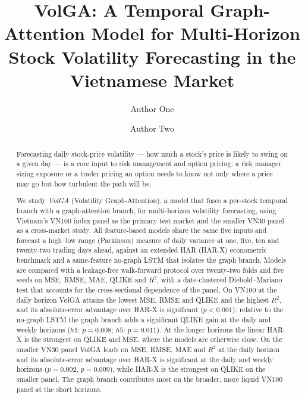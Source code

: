 \documentclass[runningheads]{llncs}
\begin{document}
\title{VolGA: A Temporal Graph-Attention Model for Multi-Horizon Stock Volatility Forecasting in the Vietnamese Market}

\author{Author One \and Author Two}

\maketitle

\begin{abstract}
Forecasting daily stock-price volatility --- how much a stock's price is likely to swing on a given
day --- is a core input to risk management and option pricing: a risk manager sizing exposure or a
trader pricing an option needs to know not only where a price may go but how turbulent the path will
be.

We study \emph{VolGA} (Volatility Graph-Attention), a model that fuses a per-stock temporal branch
with a graph-attention branch, for multi-horizon volatility forecasting, using Vietnam's VN100 index
panel as the primary test market and the smaller VN30 panel as a cross-market study. All
feature-based models share the same five inputs and forecast a high--low range (Parkinson) measure of
daily variance at one, five, ten and twenty-two trading days ahead, against an extended HAR (HAR-X)
econometric benchmark and a same-feature no-graph LSTM that isolates the graph branch. Models are
compared with a leakage-free walk-forward protocol over twenty-two folds and five seeds on MSE, RMSE,
MAE, QLIKE and $R^2$, with a date-clustered Diebold--Mariano test that accounts for the
cross-sectional dependence of the panel. On VN100 at the daily horizon VolGA attains the lowest MSE,
RMSE and QLIKE and the highest $R^2$, and its absolute-error advantage over HAR-X is significant
($p<0.001$); relative to the no-graph LSTM the graph branch adds a significant QLIKE gain at the daily
and weekly horizons ($h1$: $p=0.008$; $h5$: $p=0.011$). At the longer horizons the linear HAR-X is the
strongest on QLIKE and MSE, where the models are otherwise close. On the smaller VN30 panel VolGA
leads on MSE, RMSE, MAE and $R^2$ at the daily horizon and its absolute-error advantage over HAR-X is
significant at the daily and weekly horizons ($p=0.002$, $p=0.009$), while HAR-X is the strongest on
QLIKE on the smaller panel. The graph branch contributes most on the broader, more liquid VN100 panel
at the short horizons.
\end{abstract}
\end{document}
